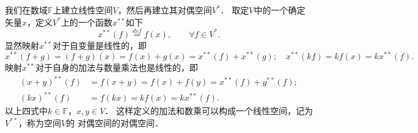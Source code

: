 我们在数域$\mathbb{F}$上建立线性空间$V$，然后再建立其对偶空间$V^*$．
取定$V$中的一个{\kaishu 确定}矢量$x$，定义$V^*$上的一个函数$x^{**}$如下
\begin{equation}\label{chmla:eqn_x-dualdual}
    x^{**}(f)\overset{def}{=}f(x), \qquad \forall f \in V^*.
\end{equation}
显然映射$x^{**}$对于自变量是线性的，即
\begin{equation*}
    x^{**}(f+g) {=}  (f+g)(x)=f(x)+g(x)=x^{**}(f)+x^{**}(g); \quad
    x^{**}(kf) {=}  k f(x) = k x^{**}(f).
\end{equation*}
映射$x^{**}$对于自身的加法与数量乘法也是线性的，即
\begin{align*}
    (x+y) ^{**}(f) &{=}  f(x+y)= f(x)+ f(y)= x^{**}(f)+y^{**}(f); \\
    (kx) ^{**}(f) &{=}  f(kx) =k f(x)=k x^{**}(f).
\end{align*}
以上四式中$k\in \mathbb{F}$，$x,y\in V$．
这样定义的加法和数乘可以构成一个线性空间，记为$V^{**}$，称为空间$V$的
对偶空间的对偶空间．

